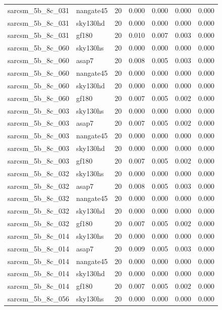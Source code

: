 \begin{tabular}{llrrrrr}
sarcsm\_5b\_8c\_031 & nangate45 & 20 & 0.000 & 0.000 & 0.000 & 0.000 \\
sarcsm\_5b\_8c\_031 & sky130hd & 20 & 0.000 & 0.000 & 0.000 & 0.000 \\
sarcsm\_5b\_8c\_031 & gf180 & 20 & 0.010 & 0.007 & 0.003 & 0.000 \\
sarcsm\_5b\_8c\_060 & sky130hs & 20 & 0.000 & 0.000 & 0.000 & 0.000 \\
sarcsm\_5b\_8c\_060 & asap7 & 20 & 0.008 & 0.005 & 0.003 & 0.000 \\
sarcsm\_5b\_8c\_060 & nangate45 & 20 & 0.000 & 0.000 & 0.000 & 0.000 \\
sarcsm\_5b\_8c\_060 & sky130hd & 20 & 0.000 & 0.000 & 0.000 & 0.000 \\
sarcsm\_5b\_8c\_060 & gf180 & 20 & 0.007 & 0.005 & 0.002 & 0.000 \\
sarcsm\_5b\_8c\_003 & sky130hs & 20 & 0.000 & 0.000 & 0.000 & 0.000 \\
sarcsm\_5b\_8c\_003 & asap7 & 20 & 0.007 & 0.005 & 0.002 & 0.000 \\
sarcsm\_5b\_8c\_003 & nangate45 & 20 & 0.000 & 0.000 & 0.000 & 0.000 \\
sarcsm\_5b\_8c\_003 & sky130hd & 20 & 0.000 & 0.000 & 0.000 & 0.000 \\
sarcsm\_5b\_8c\_003 & gf180 & 20 & 0.007 & 0.005 & 0.002 & 0.000 \\
sarcsm\_5b\_8c\_032 & sky130hs & 20 & 0.000 & 0.000 & 0.000 & 0.000 \\
sarcsm\_5b\_8c\_032 & asap7 & 20 & 0.008 & 0.005 & 0.003 & 0.000 \\
sarcsm\_5b\_8c\_032 & nangate45 & 20 & 0.000 & 0.000 & 0.000 & 0.000 \\
sarcsm\_5b\_8c\_032 & sky130hd & 20 & 0.000 & 0.000 & 0.000 & 0.000 \\
sarcsm\_5b\_8c\_032 & gf180 & 20 & 0.007 & 0.005 & 0.002 & 0.000 \\
sarcsm\_5b\_8c\_014 & sky130hs & 20 & 0.000 & 0.000 & 0.000 & 0.000 \\
sarcsm\_5b\_8c\_014 & asap7 & 20 & 0.009 & 0.005 & 0.003 & 0.000 \\
sarcsm\_5b\_8c\_014 & nangate45 & 20 & 0.000 & 0.000 & 0.000 & 0.000 \\
sarcsm\_5b\_8c\_014 & sky130hd & 20 & 0.000 & 0.000 & 0.000 & 0.000 \\
sarcsm\_5b\_8c\_014 & gf180 & 20 & 0.007 & 0.005 & 0.002 & 0.000 \\
sarcsm\_5b\_8c\_056 & sky130hs & 20 & 0.000 & 0.000 & 0.000 & 0.000 \\

\end{tabular}
